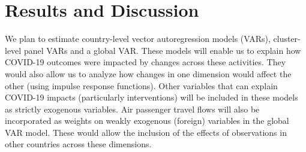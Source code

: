 \documentclass[titlepage,oneside,12pt]{article}
\newcommand{\?}{\stackrel{?}{=}}
\begin{document}


\section{Results and Discussion}


We plan to estimate country-level vector autoregression models (VARs), cluster-level panel VARs and a global VAR.
These models will enable us to explain how COVID-19 outcomes were impacted by changes across these activities.
They would also allow us to analyze how changes in one dimension would affect the other (using impulse response functions).
Other variables that can explain COVID-19 impacts (particularly interventions) will be included in these models as strictly exogenous variables.
Air passenger travel flows will also be incorporated as weights on weakly exogenous (foreign) variables in the global VAR model.
These would allow the inclusion of the effects of observations in other countries across these dimensions.
\end{document}
